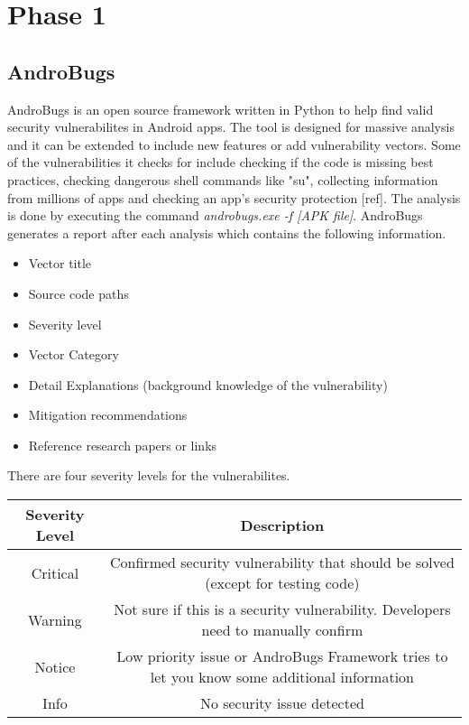 \documentclass{mproj}
\begin{document}
\section{Phase 1}
\subsection{AndroBugs}

AndroBugs is an open source framework written in Python to help find valid security vulnerabilites in Android apps. The tool is designed for massive analysis and it can be extended to include new features or add vulnerability vectors. Some of the vulnerabilities it checks for include checking if the code is missing best practices, checking dangerous shell commands like "su", collecting information from millions of apps and checking an app’s security protection [ref].  The analysis is done by executing the command \textit{androbugs.exe -f [APK file]}. AndroBugs generates a report after each analysis which contains the following information.
\begin{itemize}
\item Vector title
\item Source code paths
\item Severity level
\item Vector Category
\item Detail Explanations (background knowledge of the vulnerability)
\item Mitigation recommendations
\item Reference research papers or links
\end{itemize}

There are four severity levels for the vulnerabilites. 
\begin{table}[ht]
\centering
\resizebox{\textwidth}{!}
{\begin{tabular}{ | c | c | } 
\hline
Severity Level & Description \\ [0.5ex] 
\hline
Critical & Confirmed security vulnerability that should be solved (except for testing code) \\
\hline
Warning & Not sure if this is a security vulnerability. Developers need to manually confirm \\
\hline
Notice & Low priority issue or AndroBugs Framework tries to let you know some additional information \\
\hline
Info & No security issue detected \\
\hline
\end{tabular}}
\end{table}
\end{document}
